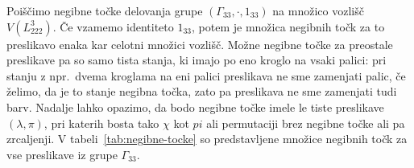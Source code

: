 \documentclass[12pt,a4paper]{amsart}
\theoremstyle{definition} %
\theoremstyle{plain} %
\begin{document}
    Poiščimo negibne točke delovanja grupe $ (\Gamma_{33}, \cdot,1_{33} ) $ na množico vozlišč $V(L_{222}^3)$. Če vzamemo identiteto $1_{33}$, potem je množica negibnih točk za to preslikavo enaka kar celotni množici vozlišč. 
    Možne negibne točke za preostale preslikave pa so samo tista stanja, ki imajo po eno kroglo na vsaki palici: pri stanju z npr.\ dvema kroglama na eni palici preslikava ne sme zamenjati palic, če želimo, da je to stanje negibna točka, zato pa preslikava ne sme zamenjati tudi barv.
    Nadalje lahko opazimo, da bodo negibne točke imele le tiste preslikave $(\lambda, \pi)$, pri katerih bosta tako $\chi$ kot $pi$ ali permutaciji brez negibne točke ali pa zrcaljenji. V tabeli~\ref{tab:negibne-tocke} so predstavljene množice negibnih točk za vse preslikave iz grupe $\Gamma_{33}$.
    
\end{document}
